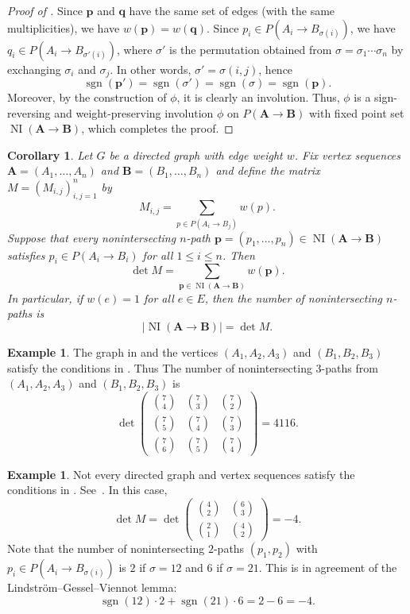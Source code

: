 \documentclass[oneside]{book}
\numberwithin{equation}{section}
\newtheorem{cor}[thm]{Corollary}
\theoremstyle{definition}
\newtheorem{exam}[thm]{Example}
\newcommand\NI{\operatorname{NI}}
\newcommand\sgn{\operatorname{sgn}}
\renewcommand\vec[1]{\bm{#1}}
\begin{document}
\begin{proof}[Proof of ]
Since \( \vec p \) and \( \vec q \) have the same set of edges (with
the same multiplicities), we have \( w(\vec p) = w(\vec q) \). Since
\(p_i\in P(A_i\to B_{\sigma(i)}) \), we have
\(q_i\in P(A_i\to B_{\sigma'(i)}) \), where \( \sigma' \) is the
permutation obtained from \( \sigma = \sigma_1 \cdots \sigma_n \) by
exchanging \( \sigma_i \) and \( \sigma_j \). In other words,
\( \sigma'=\sigma (i,j) \), hence
\[
  \sgn(\vec p') = \sgn(\sigma') = \sgn(\sigma) = \sgn(\vec p).
\]
Moreover, by the construction of \( \phi \), it is clearly an
involution. Thus, \( \phi \) is a sign-reversing and weight-preserving
involution \( \phi \) on \( P(\vec A\to \vec B) \) with fixed point
set \( \NI(\vec A\to \vec B) \), which completes the proof.
\end{proof}

\begin{cor}\label{cor:LGV}
  Let \( G \) be a directed graph with edge weight \( w \). Fix vertex
  sequences \( \vec A = (A_1,\dots,A_n) \) and
  \( \vec B = (B_1,\dots,B_n) \) and define the matrix
  \( M = (M_{i,j})_{i,j=1}^n \) by
\[
  M_{i,j} = \sum_{p\in P(A_i\to B_j)} w(p).
\]
Suppose that  every nonintersecting \( n \)-path 
\( \vec p = (p_1,\dots,p_n)\in \NI(\vec A \to \vec B) \)
satisfies \( p_i \in P(A_i\to B_i) \) for all \( 1\le i\le n \).
Then 
\[
  \det M = \sum_{\vec p \in \NI(\vec A \to \vec B)} w(\vec p).
\]
In particular, if \( w(e) = 1 \) for all \( e\in E \), then the number
of nonintersecting \( n \)-paths is
\[
  |\NI(\vec A \to \vec B)| = \det M.
\]
\end{cor}

\begin{exam}
  The graph in  and the vertices \( (A_1,A_2,A_3) \)
  and \( (B_1,B_2,B_3) \) satisfy the conditions in .
  Thus The number of nonintersecting \( 3 \)-paths from
  \( (A_1,A_2,A_3) \) and \( (B_1,B_2,B_3) \) is
  \[
    \det
    \begin{pmatrix}
\binom{7}{4} & \binom{7}{3} & \binom{7}{2}\\[4pt]
\binom{7}{5} & \binom{7}{4} & \binom{7}{3}\\[4pt]
\binom{7}{6} & \binom{7}{5} & \binom{7}{4}
\end{pmatrix} = 4116.
  \]
\end{exam}

\begin{exam}
  Not every directed graph and vertex sequences satisfy the conditions
  in . See~.
  In this case,
  \[
   \det M =  \det
    \begin{pmatrix}
\binom{4}{2} & \binom{6}{3}\\[4pt]
\binom{2}{1} & \binom{4}{2}
\end{pmatrix} = -4.
  \]
  Note that the number of nonintersecting \( 2 \)-paths
  \( (p_1,p_2) \) with \( p_i\in P(A_i\to B_{\sigma(i)}) \) is \( 2 \)
  if \( \sigma = 12 \) and \( 6 \) if \( \sigma = 21 \).
  This is in agreement of the Lindstr\"om--Gessel--Viennot lemma:
  \[
    \sgn(12) \cdot 2 + \sgn(21) \cdot 6 = 2-6 = -4.
  \]
\end{exam}
\end{document}
